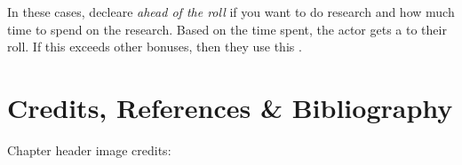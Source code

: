 In these cases, decleare \emph{ahead of the roll} if you want to do research and how
much time to spend on the research. Based on the time spent, the actor gets a 
to their roll. If this  exceeds other bonuses, then they use this
.

\section*{Credits, References \& Bibliography}

Chapter header image credits: \cite{dice_image}

\printbibliography[heading=none]

